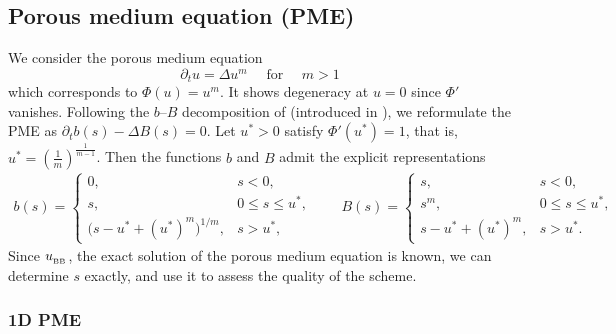 \documentclass[review,11pt]{article}
\numberwithin{equation}{section}
\begin{document}
\subsection{Porous medium equation (PME)}\label{sec:porous_medium_equation}
We consider the porous medium equation
\begin{equation}\label{eq:PME}
\partial_t u = \Delta u^m \quad \text{ for }\quad  m>1
\end{equation}
which corresponds to $\Phi(u)=u^m$. It shows degeneracy at $u = 0$ since $\Phi'$ vanishes. Following the $b$--$B$ decomposition of  (introduced in \cite{javed2025robust}), we reformulate the PME as $\partial_t b(s) - \Delta B(s) = 0$. Let $u^*>0$ satisfy $\Phi'(u^*)=1$, that is, $u^*=\left(\frac{1}{m}\right)^{\frac{1}{m-1}}$. Then the functions $b$ and $B$ admit the explicit representations
\begin{align}\label{eq:bB_PME}
b(s)=
\begin{cases}
0, & s<0,\\[4pt]
s, & 0\le s\le u^*,\\[4pt]
\bigl(s-u^*+(u^*)^m\bigr)^{1/m}, & s>u^*,
\end{cases}
\qquad
B(s)=
\begin{cases}
s, & s<0,\\[4pt]
s^m, & 0\le s\le u^*,\\[4pt]
s-u^*+(u^*)^m, & s>u^*.
\end{cases}
\end{align}
 Since $u_{\,\!_{\rm BB}}$, the exact solution of the porous medium equation is known, we can determine $s$ exactly, and use it to assess the quality of the scheme.
\subsubsection{1D PME}\label{sec:1DPME_1DST}

\end{document}
